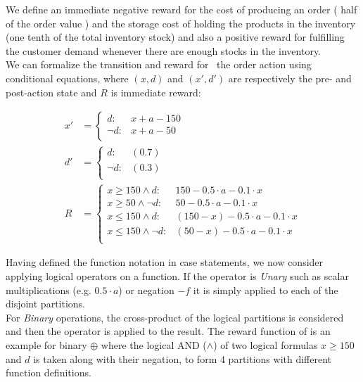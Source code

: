 \documentclass[letterpaper]{article}
\renewcommand{\-}{\text{-}}
\begin{document}
\begin{example*}[\InventoryControl]
We define an immediate negative reward for the cost of producing an order ( half of the order value ) and the storage cost of holding the products in the inventory (one tenth of the total inventory stock) and also a positive reward for fulfilling the customer demand whenever there are enough stocks in the inventory.\\
We can formalize the transition and reward for \InventoryControl\ the order action using conditional equations, where $(x,d)$ and $(x',d')$ are respectively the pre- and post-action state and $R$ is immediate reward:
\end{example*}
{\footnotesize
\begin{align*}
x' & = \begin{cases}
d     : & x + a - 150 \\
\neg d: & x + a - 50    \\
\end{cases}\\
d' & =  \begin{cases}
d     : &(0.7)\\
\neg d: &(0.3)\\
\end{cases}\\
R & = \begin{cases}
x \geq 150 \wedge d: & 150 - 0.5\cdot a - 0.1\cdot x \\
x \geq 50 \wedge \neg d: & 50 - 0.5\cdot a - 0.1\cdot x  \\
x \leq 150 \wedge d: &  (150-x)-0.5\cdot a - 0.1\cdot x \\
x \leq 150 \wedge \neg d: & (50-x)- 0.5\cdot a - 0.1\cdot x \\
\end{cases}
\end{align*}}

Having defined the function notation in case statements, we now consider applying logical operators on a function. 
If the operator is \textit{Unary} such as scalar multiplications (e.g. $0.5 \cdot a$) or negation $-f$ it is simply applied to each of the disjoint partitions. 
\\ For \textit{Binary} operations, the cross-product of the logical partitions is considered and then the operator is applied to the result. The reward function of \InventoryControl is an 
example for binary $\oplus$ where the logical AND ($\wedge$) of two logical formulas  $x \geq 150 $ and $d$ is taken along with their negation, to form 4 partitions with different function definitions. 
\end{document}
